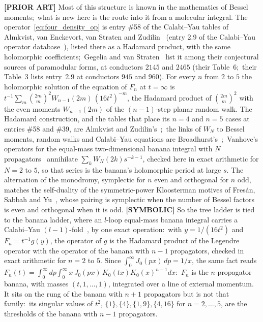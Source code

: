 \documentclass[aps,pra,twocolumn,superscriptaddress,longbibliography]{revtex4-2}
\begin{document}
\textbf{[PRIOR ART]} Most of this structure is known in the mathematics of
Bessel moments;\ what is new here is the route into it from a molecular
integral.  The operator~\eqref{eq:four_density_op} is entry \#58 of the
Calabi--Yau tables of Almkvist, van Enckevort, van Straten and
Zudilin~\cite{aesz2005} (entry 2.9 of the Calabi--Yau operator
database~\cite{cydb}), listed there as a Hadamard product, with the same
holomorphic coefficients;\ Gegelia and van
Straten~\cite{gegelia_vanstraten2024} list it among their conjectural
sources of paramodular forms, at conductors $2145$ and $2465$ (their
Table~6;\ their Table~3 lists entry~2.9 at conductors $945$ and $960$).  For every
$n$ from $2$ to $5$ the holomorphic solution of the equation of $F_n$ at
$t=\infty$ is $t^{-1}\sum_m\binom{2m}{m}^2W_{n-1}(2m)\,(16t^2)^{-m}$, the
Hadamard product of $\binom{2m}{m}^2$ with the even moments $W_{n-1}(2m)$
of the $(n-1)$-step planar random walk.  The Hadamard construction, and the
tables that place its $n=4$ and $n=5$ cases at entries \#58 and \#39, are
Almkvist and Zudilin's~\cite{almkvist_zudilin2007};\ the links of $W_N$ to
Bessel moments, random walks and Calabi--Yau equations are
Broadhurst's~\cite{broadhurst2009walks};\ Vanhove's operators for the
equal-mass two-dimensional banana integral with $N$
propagators~\cite{vanhove2014} annihilate $\sum_k W_N(2k)s^{-k-1}$, checked
here in exact arithmetic for $N=2$ to $5$, so that series is the banana's
holomorphic period at large $s$.  The
alternation of the monodromy, symplectic for $n$ even and orthogonal for
$n$ odd, matches the self-duality of the symmetric-power Kloosterman
motives of Fres\'an, Sabbah and Yu~\cite{fresansabbahyu2023}, whose
pairing is symplectic when the number of Bessel factors is even and
orthogonal when it is odd.  \textbf{[SYMBOLIC]} So the tree ladder is tied to the banana ladder,
where an $l$-loop equal-mass banana integral carries a Calabi--Yau
$(l-1)$-fold~\cite{bonisch2021}, by one exact operation:\ with
$y=1/(16t^2)$ and $F_n=t^{-1}g(y)$, the operator of $g$ is the Hadamard
product of the Legendre operator with the operator of the banana with $n-1$
propagators, checked in exact arithmetic for $n=2$ to $5$.  Since
$\int_0^\infty J_0(px)\,dp=1/x$, the same fact reads
$F_n(t)=\int_0^\infty dp\int_0^\infty x\,J_0(px)\,K_0(tx)K_0(x)^{n-1}dx$:\
$F_n$ is the $n$-propagator banana, with masses $(t,1,\dots,1)$, integrated
over a line of external momentum.  It sits on the rung of the banana with
$n+1$ propagators but is not that family:\ its singular values of $t^2$,
$\{1\},\{4\},\{1,9\},\{4,16\}$ for $n=2,\dots,5$, are the thresholds of the
banana with $n-1$ propagators.
\end{document}

